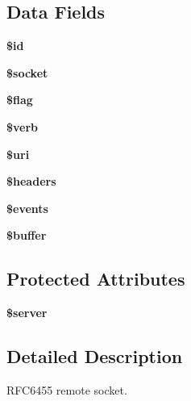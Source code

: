 \subsection*{Data Fields}
\begin{DoxyCompactItemize}
\item 
\hypertarget{class_c_l_i_1_1_agent_ae97941710d863131c700f069b109991e}{}\label{class_c_l_i_1_1_agent_ae97941710d863131c700f069b109991e} 
{\bfseries \$id}
\item 
\hypertarget{class_c_l_i_1_1_agent_a33a9dcf5eaeebf833f2390060f8caf5e}{}\label{class_c_l_i_1_1_agent_a33a9dcf5eaeebf833f2390060f8caf5e} 
{\bfseries \$socket}
\item 
\hypertarget{class_c_l_i_1_1_agent_acf5d6dd3ee125abb9a2523b30bc47d02}{}\label{class_c_l_i_1_1_agent_acf5d6dd3ee125abb9a2523b30bc47d02} 
{\bfseries \$flag}
\item 
\hypertarget{class_c_l_i_1_1_agent_a5cf28d6459cf3f947b02ad0f31602a9e}{}\label{class_c_l_i_1_1_agent_a5cf28d6459cf3f947b02ad0f31602a9e} 
{\bfseries \$verb}
\item 
\hypertarget{class_c_l_i_1_1_agent_a653b5458163d338546c47271b4fb81b7}{}\label{class_c_l_i_1_1_agent_a653b5458163d338546c47271b4fb81b7} 
{\bfseries \$uri}
\item 
\hypertarget{class_c_l_i_1_1_agent_a52500036ee807241b8b4b7e2367c49ef}{}\label{class_c_l_i_1_1_agent_a52500036ee807241b8b4b7e2367c49ef} 
{\bfseries \$headers}
\item 
\hypertarget{class_c_l_i_1_1_agent_a1bcec9bbd34255927faaf155bf3a940a}{}\label{class_c_l_i_1_1_agent_a1bcec9bbd34255927faaf155bf3a940a} 
{\bfseries \$events}
\item 
\hypertarget{class_c_l_i_1_1_agent_af1862006a19e84e552f66189adc792ae}{}\label{class_c_l_i_1_1_agent_af1862006a19e84e552f66189adc792ae} 
{\bfseries \$buffer}
\end{DoxyCompactItemize}
\subsection*{Protected Attributes}
\begin{DoxyCompactItemize}
\item 
\hypertarget{class_c_l_i_1_1_agent_ad135cc8a47e55f0829949cf62214170f}{}\label{class_c_l_i_1_1_agent_ad135cc8a47e55f0829949cf62214170f} 
{\bfseries \$server}
\end{DoxyCompactItemize}


\subsection{Detailed Description}
R\+F\+C6455 remote socket. 

